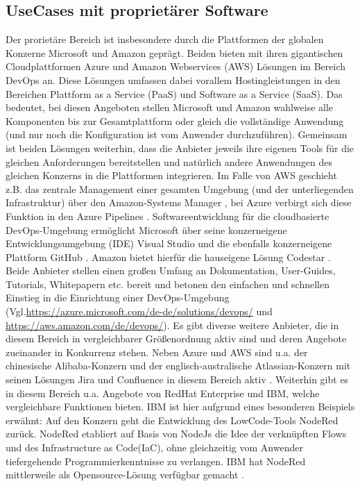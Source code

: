 \subsection{UseCases mit proprietärer Software}
\label{UseCases mit proprietärer Software}
Der prorietäre Bereich ist insbesondere durch die Plattformen der globalen Konzerne Microsoft und Amazon geprägt. Beiden bieten mit ihren gigantischen Cloudplattformen Azure und Amazon Webservices (\acrshort{AWS}) Lösungen im Bereich \gls{DevOps} an. Diese Lösungen umfassen dabei vorallem Hostingleistungen in den Bereichen Plattform as a Service (\acrshort{PaaS}) und Software as a Service (\acrshort{SaaS}). Das bedeutet, bei diesen Angeboten stellen Microsoft und Amazon wahlweise alle Komponenten bis zur Gesamtplattform oder gleich die vollständige Anwendung (und nur noch die Konfiguration ist vom Anwender durchzuführen).
Gemeinsam ist beiden Lösungen weiterhin, dass die Anbieter jeweils ihre eigenen Tools für die gleichen Anforderungen bereitstellen und natürlich andere Anwendungen des gleichen Konzerns in die Plattformen integrieren.
Im Falle von \acrshort{AWS} geschieht z.B. das zentrale Management einer gesamten Umgebung (und der unterliegenden Infrastruktur) über den Amazon-Systems Manager \cite{aws_systems_manager}, bei Azure verbirgt sich diese Funktion in den Azure Pipelines \cite{azure_devops_loesungen}.
Softwareentwicklung für die cloudbasierte \gls{DevOps}-Umgebung ermöglicht Microsoft über seine konzerneigene Entwicklungsumgebung (\acrshort{IDE}) Visual Studio und die ebenfalls konzerneigene Plattform  GitHub \cite{azure_devops_loesungen}. Amazon bietet hierfür die hauseigene Lösung Codestar \cite{aws_codestar}.
Beide Anbieter stellen einen großen Umfang an Dokumentation, User-Guides, Tutorials, Whitepapern etc. bereit und betonen den einfachen und schnellen Einstieg in die Einrichtung einer \gls{DevOps}-Umgebung (Vgl.\url{https://azure.microsoft.com/de-de/solutions/devops/} und \url{https://aws.amazon.com/de/devops/}).\newline
Es gibt diverse weitere Anbieter, die in diesem Bereich in vergleichbarer Größenordnung aktiv sind und deren Angebote zueinander in Konkurrenz stehen. Neben Azure und \acrshort{AWS} sind u.a. der chinesische Alibaba-Konzern \cite{alibaba_devops} und der englisch-australische Atlassian-Konzern mit seinen Lösungen Jira und Confluence in diesem Bereich aktiv \cite{atlassian_jira_nodate}. 
Weiterhin gibt es in diesem Bereich u.a. Angebote von RedHat Enterprise \cite{redhat_openshift_2017} und IBM, welche vergleichbare Funktionen bieten. IBM ist hier aufgrund eines besonderen Beispiels erwähnt: Auf den Konzern geht die Entwicklung des \gls{LowCode}-Tools NodeRed zurück. NodeRed etabliert auf Basis von NodeJs die Idee der verknüpften Flows und des \glqq{}Infrastructure as Code\grqq (\acrshort{IaC}), ohne gleichzeitig vom Anwender tiefergehende Programmierkenntnisse zu verlangen. IBM hat NodeRed mittlerweile als Opensource-Lösung verfügbar gemacht \cite{nodered_about}.
